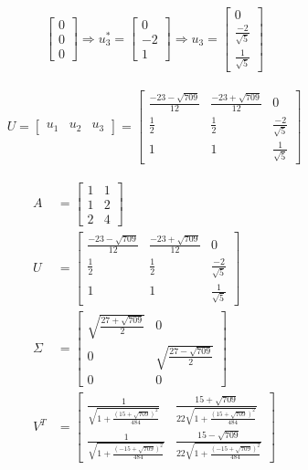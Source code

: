 \documentclass[a4paper, spanish]{article}
\begin{document}
\begin{align}
\begin{bmatrix}
        0 \\
        0 \\
        0
      \end{bmatrix}
      \Rightarrow
      u_3^* =
      \begin{bmatrix}
        0 \\
        -2 \\
        1
      \end{bmatrix}
      \Rightarrow
      u_3 =
      \begin{bmatrix}
        0 \\
        \frac{-2}{\sqrt{5}} \\
        \frac{1}{\sqrt{5}}
      \end{bmatrix}
    \end{align}

    \begin{align}
      U =
      \begin{bmatrix}
        u_1 & u_2 & u_3
      \end{bmatrix} =
      \begin{bmatrix}
        \frac{-23-\sqrt{709}}{12} & \frac{-23+\sqrt{709}}{12} & 0 \\
        \frac{1}{2} & \frac{1}{2} & \frac{-2}{\sqrt{5}} \\
        1 & 1 & \frac{1}{\sqrt{5}}
      \end{bmatrix}
    \end{align}


    \begin{align}
      A &=
      \begin{bmatrix}
        1 & 1\\
        1 & 2\\
        2 & 4
      \end{bmatrix} \\
      U &=
      \begin{bmatrix}
        \frac{-23-\sqrt{709}}{12} & \frac{-23+\sqrt{709}}{12} & 0 \\
        \frac{1}{2} & \frac{1}{2} & \frac{-2}{\sqrt{5}} \\
        1 & 1 & \frac{1}{\sqrt{5}}
      \end{bmatrix} \\
      \Sigma &=
      \begin{bmatrix}
        \sqrt{\frac{27 + \sqrt{709}}{2}} & 0 \\
        0 & \sqrt{\frac{27 - \sqrt{709}}{2}} \\
        0 & 0
      \end{bmatrix} \\
      V^T &=
      \begin{bmatrix}
        \frac{1}{\sqrt{1 + \frac{(15 + \sqrt{709})^2}{484}}} &  \frac{15 + \sqrt{709}}{22\sqrt{1 + \frac{(15 + \sqrt{709})^2}{484}}}  \\
        \frac{1}{\sqrt{1 + \frac{(- 15 + \sqrt{709})^2}{484}}} & \frac{15 - \sqrt{709}}{22\sqrt{1 + \frac{(- 15 + \sqrt{709})^2}{484}}}
      \end{bmatrix}
    \end{align}
\end{document}
